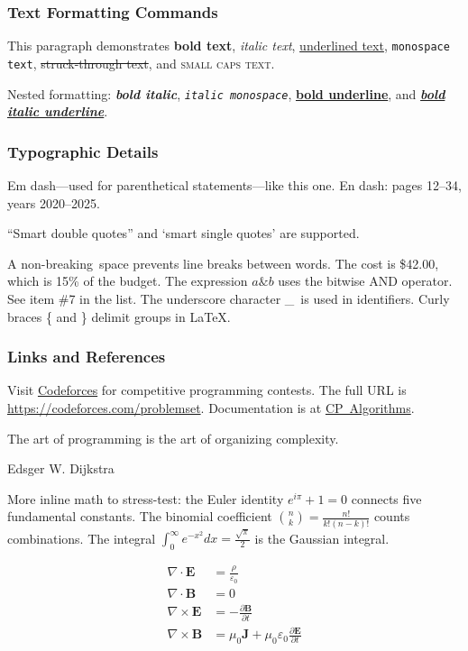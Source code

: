 \subsubsection{Text Formatting Commands}

This paragraph demonstrates \textbf{bold text}, \textit{italic text},
\underline{underlined text}, \texttt{monospace text}, \sout{struck-through text},
and \textsc{small caps text}.

Nested formatting: \textbf{\textit{bold italic}}, \textit{\texttt{italic monospace}},
\textbf{\underline{bold underline}}, and \textbf{\textit{\underline{bold italic underline}}}.

\subsubsection{Typographic Details}

Em dash---used for parenthetical statements---like this one.
En dash: pages 12--34, years 2020--2025.

``Smart double quotes'' and `smart single quotes' are supported.

A non-breaking~space prevents line breaks between words. The cost is \$42.00,
which is 15\% of the budget. The expression $a \& b$ uses the bitwise AND operator.
See item \#7 in the list. The underscore character \_\ is used in identifiers.
Curly braces \{ and \} delimit groups in \LaTeX.

\subsubsection{Links and References}

Visit \href{https://codeforces.com}{Codeforces} for competitive programming contests.
The full URL is \url{https://codeforces.com/problemset}.
Documentation is at \href{https://cp-algorithms.com/algebra/sieve-of-eratosthenes.html}{CP~Algorithms}.

\epigraph{The art of programming is the art of organizing complexity.}{Edsger W. Dijkstra}

More inline math to stress-test: the Euler identity $e^{i\pi} + 1 = 0$ connects
five fundamental constants. The binomial coefficient $\binom{n}{k} = \frac{n!}{k!(n-k)!}$
counts combinations. The integral $\int_0^\infty e^{-x^2} dx = \frac{\sqrt{\pi}}{2}$
is the Gaussian integral.

$$\begin{align}
\nabla \cdot \mathbf{E} &= \frac{\rho}{\varepsilon_0} \\
\nabla \cdot \mathbf{B} &= 0 \\
\nabla \times \mathbf{E} &= -\frac{\partial \mathbf{B}}{\partial t} \\
\nabla \times \mathbf{B} &= \mu_0 \mathbf{J} + \mu_0 \varepsilon_0 \frac{\partial \mathbf{E}}{\partial t}
\end{align}$$


